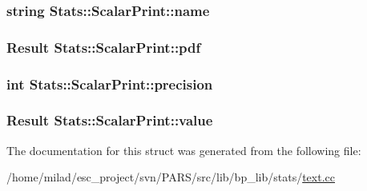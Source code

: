 \label{structStats_1_1ScalarPrint_a920e3f724dce9d9a24810a16ffacb4bb}
\hypertarget{structStats_1_1ScalarPrint_a5be372119c7d55a9d96688aaa060cc79}{
\subsubsection[{name}]{\setlength{\rightskip}{0pt plus 5cm}string {\bf Stats::ScalarPrint::name}}}
\label{structStats_1_1ScalarPrint_a5be372119c7d55a9d96688aaa060cc79}
\hypertarget{structStats_1_1ScalarPrint_acd1df1a0346a2bd5dd90086550663eea}{
\subsubsection[{pdf}]{\setlength{\rightskip}{0pt plus 5cm}Result {\bf Stats::ScalarPrint::pdf}}}
\label{structStats_1_1ScalarPrint_acd1df1a0346a2bd5dd90086550663eea}
\hypertarget{structStats_1_1ScalarPrint_a879b6ff384c6685845e308118c0d82d3}{
\subsubsection[{precision}]{\setlength{\rightskip}{0pt plus 5cm}int {\bf Stats::ScalarPrint::precision}}}
\label{structStats_1_1ScalarPrint_a879b6ff384c6685845e308118c0d82d3}
\hypertarget{structStats_1_1ScalarPrint_a45fe47d5d3b39603727f5641c51ba4fd}{
\subsubsection[{value}]{\setlength{\rightskip}{0pt plus 5cm}Result {\bf Stats::ScalarPrint::value}}}
\label{structStats_1_1ScalarPrint_a45fe47d5d3b39603727f5641c51ba4fd}


The documentation for this struct was generated from the following file:\begin{DoxyCompactItemize}
\item 
/home/milad/esc\_\-project/svn/PARS/src/lib/bp\_\-lib/stats/\hyperlink{text_8cc}{text.cc}\end{DoxyCompactItemize}
